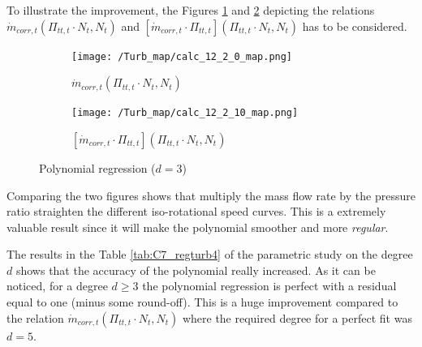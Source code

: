 To illustrate the improvement, the Figures \ref{fig:C7_mturb3} and \ref{fig:C7_mturbevo} depicting the relations $\dot{m}_{corr,t}(\Pi_{tt,t}\cdot N_t,N_t)$ and $[\dot{m}_{corr,t}\cdot \Pi_{tt,t}](\Pi_{tt,t}\cdot N_t,N_t)$ has to be considered. 

\begin{figure}[H]
    \centering
    \begin{subfigure}[b]{0.4\textwidth}
        \centering
        \texttt{[image: /Turb\_map/calc\_12\_2\_0\_map.png]}
        \caption{$\dot{m}_{corr,t}(\Pi_{tt,t}\cdot N_t,N_t)$}
        \label{fig:C7_mturb3}
    \end{subfigure}
    \begin{subfigure}[b]{0.4\textwidth}
        \centering
        \texttt{[image: /Turb\_map/calc\_12\_2\_10\_map.png]}
        \caption{$[\dot{m}_{corr,t}\cdot \Pi_{tt,t}](\Pi_{tt,t}\cdot N_t,N_t)$}
        \label{fig:C7_mturbevo}
    \end{subfigure}
    \caption{Polynomial regression ($d=3$)} \label{fig:C7_polycomp_m}
\end{figure}

Comparing the two figures shows that multiply the mass flow rate by the pressure ratio straighten the different iso-rotational speed curves. This is a extremely valuable result since it will make the polynomial smoother and more \textit{regular}.

The results in the Table \ref{tab:C7_regturb4} of the parametric study on the degree $d$ shows that the accuracy of the polynomial really increased. As it can be noticed, for a degree $d\geq 3$ the polynomial regression is perfect with a residual equal to one (minus some round-off). This is a huge improvement compared to the relation $\dot{m}_{corr,t}(\Pi_{tt,t}\cdot N_t,N_t)$ where the required degree for a perfect fit was $d=5$.

